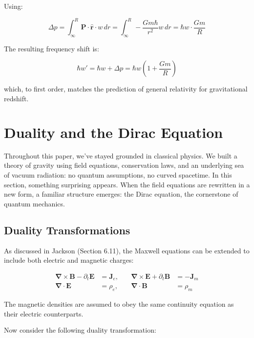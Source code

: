 \documentclass {article}
\renewcommand\vec{\mathbf}
\let\OldS\nabla
\renewcommand{\nabla}{\boldsymbol{\OldS}}
\let\OldHat\hat
\renewcommand{\hat}[1]{\OldHat{\mathbf{#1}}}
\begin{document}
Using:

\begin{equation}
\Delta p = \int_{\infty}^{R} \vec{P} \cdot \hat{r} \cdot w \, dr = \int_{\infty}^{R} - \frac{G m \hbar}{r^2} w \, dr = \hbar w \cdot \frac{G m}{R}
\end{equation}

The resulting frequency shift is:

\begin{equation}
\hbar w' = \hbar w + \Delta p = \hbar w \left( 1 + \frac{G m}{R} \right)
\end{equation}

which, to first order, matches the prediction of general relativity for gravitational redshift.

		
\section{Duality and the Dirac Equation}

Throughout this paper, we’ve stayed grounded in classical physics. We built a theory of gravity using field equations, conservation laws, and an underlying sea of vacuum radiation: no quantum assumptions, no curved spacetime. In this section, something surprising appears. When the field equations are rewritten in a new form, a familiar structure emerges: the Dirac equation, the cornerstone of quantum mechanics.

\subsection{Duality Transformations}

As discussed in Jackson (Section 6.11), the Maxwell equations can be extended to include both electric and magnetic charges:

\begin{equation}
\begin{aligned}
\nabla \times \vec{B} - \partial_t \vec{E} &= \vec{J}_e, \quad
&\nabla \times \vec{E} + \partial_t \vec{B} &= -\vec{J}_m \\
\nabla \cdot \vec{E} &= \rho_e, \quad
&\nabla \cdot \vec{B} &= \rho_m
\end{aligned}
\end{equation}


The magnetic densities are assumed to obey the same continuity equation as their electric counterparts.

Now consider the following duality transformation:
\end{document}
